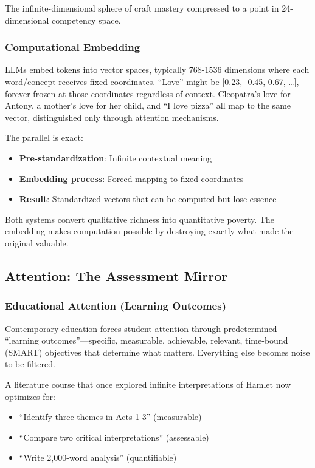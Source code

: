 The infinite-dimensional sphere of craft mastery compressed to a point in 24-dimensional competency space.

\subsubsection{Computational Embedding}

LLMs embed tokens into vector spaces, typically 768-1536 dimensions where each word/concept receives fixed coordinates. ``Love'' might be [0.23, -0.45, 0.67, \ldots], forever frozen at those coordinates regardless of context. Cleopatra's love for Antony, a mother's love for her child, and ``I love pizza'' all map to the same vector, distinguished only through attention mechanisms.

The parallel is exact:
\begin{itemize}
\item \textbf{Pre-standardization}: Infinite contextual meaning
\item \textbf{Embedding process}: Forced mapping to fixed coordinates
\item \textbf{Result}: Standardized vectors that can be computed but lose essence
\end{itemize}

Both systems convert qualitative richness into quantitative poverty. The embedding makes computation possible by destroying exactly what made the original valuable.

\subsection{Attention: The Assessment Mirror}

\subsubsection{Educational Attention (Learning Outcomes)}

Contemporary education forces student attention through predetermined ``learning outcomes''---specific, measurable, achievable, relevant, time-bound (SMART) objectives that determine what matters. Everything else becomes noise to be filtered.

A literature course that once explored infinite interpretations of Hamlet now optimizes for:
\begin{itemize}
\item ``Identify three themes in Acts 1-3'' (measurable)
\item ``Compare two critical interpretations'' (assessable)
\item ``Write 2,000-word analysis'' (quantifiable)
\end{itemize}

